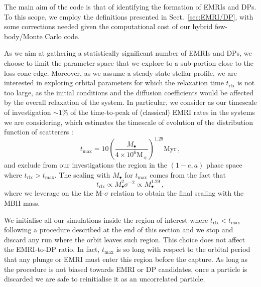 \documentclass[desactivate]{aa}
\begin{document}
        The main aim of the code is that of identifying the formation of EMRIs and DPs. To this scope, we employ the definitions presented in Sect.\ \ref{sec:EMRI/DP}, with some corrections needed given the computational cost of our hybrid few-body/Monte Carlo code.

        As we aim at gathering a statistically significant number of EMRIs and DPs, we choose to limit the parameter space that we explore to a sub-portion close to the loss cone edge. Moreover, as we assume a steady-state stellar profile, we are interested in exploring orbital parameters for which the relaxation time $t_\mathrm{rlx}$ is not too large, as the initial conditions and the diffusion coefficients would be affected by the overall relaxation of the system. In particular, we consider as our timescale of investigation ${\sim}1\%$ of the time-to-peak of (classical) EMRI rates in the systems we are considering, which estimates the timescale of evolution of the distribution function of scatterers \citep{2022MNRAS.514.3270B}:
        \begin{equation}
            t_\mathrm{max} = 10 \left( \frac{M_\bullet}{4 \times 10^6 \mathrm{M}_\sun} \right)^{1.29} \mathrm{Myr} \, ,
        \end{equation}
        and exclude from our investigations the region in the $(1-e,a)$ phase space where $t_\mathrm{rlx} > t_\mathrm{max}$. The scaling with $M_\bullet$ for $t_\mathrm{max}$ comes from the fact that \citep{2013degn.book.....M}
        \begin{equation}
            t_\mathrm{rlx} \propto M_\bullet ^2 \sigma^{-2} \propto M_\bullet ^ {1.29} \, ,
        \end{equation}
        where we leverage on the the M-$\sigma$ relation \citep{2009ApJ...698..198G} to obtain the final scaling with the MBH mass.

        We initialise all our simulations inside the region of interest where $t_\mathrm{rlx} < t_\mathrm{max}$ following a procedure described at the end of this section and we stop and discard any run where the orbit leaves such region. This choice does not affect the EMRI-to-DP ratio. In fact, $t_\mathrm{max}$ is so long with respect to the orbital period that any plunge or EMRI must enter this region before the capture. As long as the procedure is not biased towards EMRI or DP candidates, once a particle is discarded we are safe to reinitialise it as an uncorrelated particle.
\end{document}
